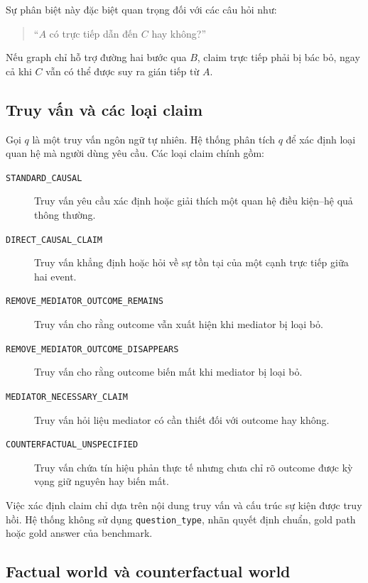 Sự phân biệt này đặc biệt quan trọng đối với các câu hỏi như:

\begin{quote}
``\(A\) có trực tiếp dẫn đến \(C\) hay không?''
\end{quote}

Nếu graph chỉ hỗ trợ đường hai bước qua \(B\), claim trực tiếp phải bị bác
bỏ, ngay cả khi \(C\) vẫn có thể được suy ra gián tiếp từ \(A\).

\subsection{Truy vấn và các loại claim}

Gọi \(q\) là một truy vấn ngôn ngữ tự nhiên. Hệ thống phân tích \(q\) để
xác định loại quan hệ mà người dùng yêu cầu. Các loại claim chính gồm:

\begin{description}
    \item[\texttt{STANDARD\_CAUSAL}] Truy vấn yêu cầu xác định hoặc giải
    thích một quan hệ điều kiện--hệ quả thông thường.

    \item[\texttt{DIRECT\_CAUSAL\_CLAIM}] Truy vấn khẳng định hoặc hỏi về
    sự tồn tại của một cạnh trực tiếp giữa hai event.

    \item[\texttt{REMOVE\_MEDIATOR\_OUTCOME\_REMAINS}] Truy vấn cho rằng
    outcome vẫn xuất hiện khi mediator bị loại bỏ.

    \item[\texttt{REMOVE\_MEDIATOR\_OUTCOME\_DISAPPEARS}] Truy vấn cho rằng
    outcome biến mất khi mediator bị loại bỏ.

    \item[\texttt{MEDIATOR\_NECESSARY\_CLAIM}] Truy vấn hỏi liệu mediator
    có cần thiết đối với outcome hay không.

    \item[\texttt{COUNTERFACTUAL\_UNSPECIFIED}] Truy vấn chứa tín hiệu phản
    thực tế nhưng chưa chỉ rõ outcome được kỳ vọng giữ nguyên hay biến mất.
\end{description}

Việc xác định claim chỉ dựa trên nội dung truy vấn và cấu trúc sự kiện được
truy hồi. Hệ thống không sử dụng \texttt{question\_type}, nhãn quyết định
chuẩn, gold path hoặc gold answer của benchmark.

\subsection{Factual world và counterfactual world}

